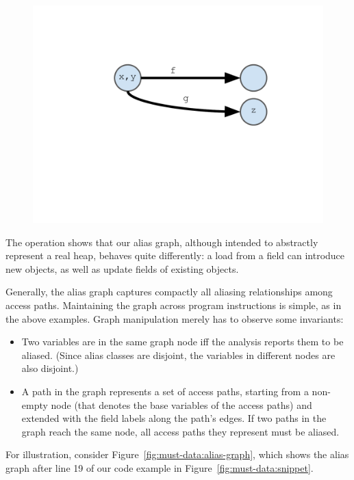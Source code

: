 \begin{figure}[h]
\centering
\includegraphics[trim={35mm 85mm 35mm 51mm},clip,width=0.8\linewidth]{assets/must-data/alias-graph3.pdf}
\end{figure}

The  operation shows that our alias graph, although intended to abstractly represent a real heap, behaves quite differently: a load from a field can introduce new objects, as well as update fields of existing objects.

Generally, the alias graph captures compactly all aliasing relationships among access paths. Maintaining the graph across program instructions is simple, as in the above examples. Graph manipulation merely has to observe some invariants:

\begin{itemize}
\item Two variables are in the same graph node iff the analysis reports them to be aliased. (Since alias classes are disjoint, the variables in different nodes are also disjoint.)

\item A path in the graph represents a set of access paths, starting from a non-empty node (that denotes the base variables of the access paths) and extended with the field labels along the path's edges. If two paths in the graph reach the same node, all access paths they represent must be aliased.
\end{itemize}

For illustration, consider Figure~\ref{fig:must-data:alias-graph}, which shows the alias graph after line 19 of our code example in Figure~\ref{fig:must-data:snippet}.

